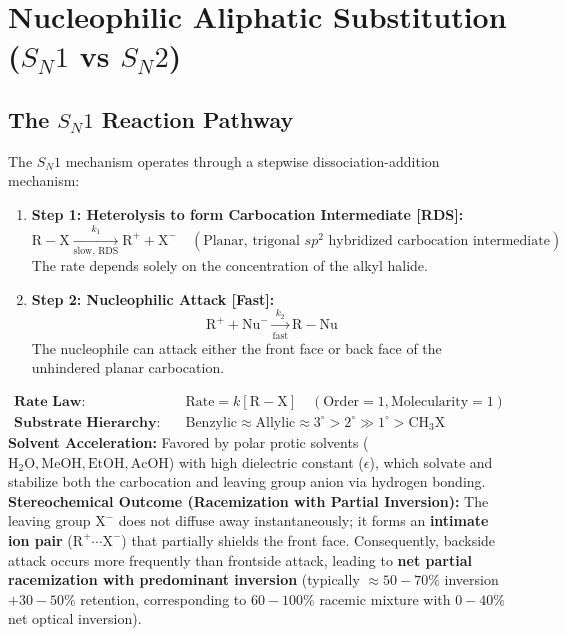 \documentclass[10pt,a4paper]{article}
\begin{document}
\newpage
\section{Nucleophilic Aliphatic Substitution (\texorpdfstring{$S_N1$}{SN1} vs \texorpdfstring{$S_N2$}{SN2})}

\subsection{The \texorpdfstring{$S_N1$}{SN1} Reaction Pathway}

\begin{conceptbox}
The $S_N1$ mechanism operates through a stepwise dissociation-addition mechanism:
\begin{enumerate}[leftmargin=*]
  \item \textbf{Step 1: Heterolysis to form Carbocation Intermediate [RDS]:}
  \begin{equation}
    \mathrm{R-X} \xrightarrow[\text{slow, RDS}]{k_1} \mathrm{R}^+ + \mathrm{X}^- \quad (\text{Planar, trigonal } sp^2 \text{ hybridized carbocation intermediate})
  \end{equation}
  The rate depends solely on the concentration of the alkyl halide.
  \item \textbf{Step 2: Nucleophilic Attack [Fast]:}
  \begin{equation}
    \mathrm{R}^+ + \mathrm{Nu}^- \xrightarrow[\text{fast}]{k_2} \mathrm{R-Nu}
  \end{equation}
  The nucleophile can attack either the front face or back face of the unhindered planar carbocation.
\end{enumerate}
\end{conceptbox}

\begin{formulabox}
\begin{align*}
  \textbf{Rate Law:} \quad & \text{Rate} = k[\mathrm{R-X}] \quad (\text{Order} = 1, \text{Molecularity} = 1)\\
  \textbf{Substrate Hierarchy:} \quad & \text{Benzylic} \approx \text{Allylic} \approx 3^\circ > 2^\circ \gg 1^\circ > \mathrm{CH_3X}
\end{align*}
\textbf{Solvent Acceleration:} Favored by polar protic solvents ($\mathrm{H_2O, MeOH, EtOH, AcOH}$) with high dielectric constant ($\epsilon$), which solvate and stabilize both the carbocation and leaving group anion via hydrogen bonding.\\[4pt]
\textbf{Stereochemical Outcome (Racemization with Partial Inversion):}
The leaving group $\mathrm{X}^-$ does not diffuse away instantaneously; it forms an \textbf{intimate ion pair} ($\mathrm{R^+\cdots X^-}$) that partially shields the front face. Consequently, backside attack occurs more frequently than frontside attack, leading to \textbf{net partial racemization with predominant inversion} (typically $\approx 50-70\%$ inversion $+ 30-50\%$ retention, corresponding to $60-100\%$ racemic mixture with $0-40\%$ net optical inversion).
\end{formulabox}
\end{document}
